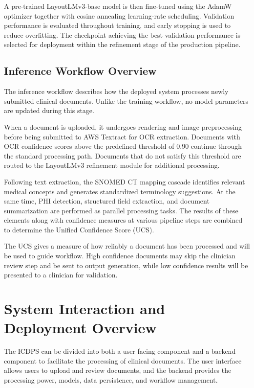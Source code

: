 A pre-trained LayoutLMv3-base model is then fine-tuned using the AdamW optimizer together with cosine annealing learning-rate scheduling. Validation performance is evaluated throughout training, and early stopping is used to reduce overfitting. The checkpoint achieving the best validation performance is selected for deployment within the refinement stage of the production pipeline.

\subsection{Inference Workflow Overview}

The inference workflow describes how the deployed system processes newly submitted clinical documents. Unlike the training workflow, no model parameters are updated during this stage.

When a document is uploaded, it undergoes rendering and image preprocessing before being submitted to AWS Textract for OCR extraction. Documents with OCR confidence scores above the predefined threshold of 0.90 continue through the standard processing path. Documents that do not satisfy this threshold are routed to the LayoutLMv3 refinement module for additional processing.

Following text extraction, the SNOMED CT mapping cascade identifies relevant medical concepts and generates standardized terminology suggestions. At the same time, PHI detection, structured field extraction, and document summarization are performed as parallel processing tasks. The results of these elements along with confidence measures at various pipeline steps are combined to determine the Unified Confidence Score (UCS).

The UCS gives a measure of how reliably a document has been processed and will be used to guide workflow. High confidence documents may skip the clinician review step and be sent to output generation, while low confidence results will be presented to a clinician for validation.

\section{System Interaction and Deployment Overview}

The ICDPS can be divided into both a user facing component and a backend component to facilitate the processing of clinical documents. The user interface allows users to upload and review documents, and the backend provides the processing power, models, data persistence, and workflow management.

